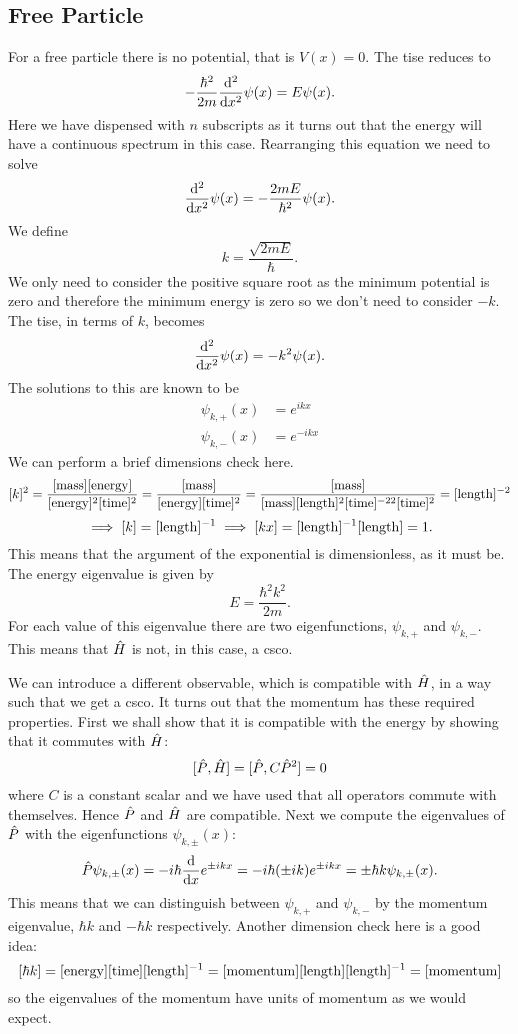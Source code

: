     \subsection{Free Particle}
    For a free particle there is no potential, that is \(V(x) = 0\).
    The \gls{tise} reduces to
    \[-\frac{\hbar^2}{2m}\dv[2]{x}\psi(x) = E\psi(x).\]
    Here we have dispensed with \(n\) subscripts as it turns out that the energy will have a continuous spectrum in this case.
    Rearranging this equation we need to solve
    \[\dv[2]{x}\psi(x) = -\frac{2mE}{\hbar^2}\psi(x).\]
    We define
    \[k = \frac{\sqrt{2mE}}{\hbar}.\]
    We only need to consider the positive square root as the minimum potential is zero and therefore the minimum energy is zero so we don't need to consider \(-k\).
    The \gls{tise}, in terms of \(k\), becomes
    \[\dv[2]{x}\psi(x) = -k^2\psi(x).\]
    The solutions to this are known to be
    \begin{align*}
        \psi_{k,+}(x) &= e^{ikx}\\
        \psi_{k,-}(x) &= e^{-ikx}
    \end{align*}
    We can perform a brief dimensions check here.
    \[[k]^2 = \frac{[\mathrm{mass}][\mathrm{energy}]}{[\mathrm{energy}]^2[\mathrm{time}]^2} = \frac{[\mathrm{mass}]}{[\mathrm{energy}][\mathrm{time}]^2} = \frac{[\mathrm{mass}]}{[\mathrm{mass}][\mathrm{length}]^2[\mathrm{time}]^{-22}[\mathrm{time}]^2} = [\mathrm{length}]^{-2}\]
    \[\implies [k] = [\mathrm{length}]^{-1} \implies [kx] = [\mathrm{length}]^{-1}[\mathrm{length}] = 1.\]
    This means that the argument of the exponential is dimensionless, as it must be.
    The energy eigenvalue is given by
    \[E = \frac{\hbar^2k^2}{2m}.\]
    For each value of this eigenvalue there are two eigenfunctions, \(\psi_{k,+}\) and \(\psi_{k,-}\).
    This means that \(\hat{H}\) is not, in this case, a \gls{csco}.
    
    We can introduce a different observable, which is compatible with \(\hat{H}\), in a way such that we get a \gls{csco}.
    It turns out that the momentum has these required properties.
    First we shall show that it is compatible with the energy by showing that it commutes with \(\hat{H}\):
    \[[\hat{P}, \hat{H}] = [\hat{P}, C\hat{P}^2] = 0\]
    where \(C\) is a constant scalar and we have used that all operators commute with themselves.
    Hence \(\hat{P}\) and \(\hat{H}\) are compatible.
    Next we compute the eigenvalues of \(\hat{P}\) with the eigenfunctions \(\psi_{k,\pm}(x)\):
    \[\hat{P}\psi_{k,\pm}(x) = -i\hbar\dv{x}e^{\pm ikx} = -i\hbar(\pm ik)e^{\pm ikx} = \pm \hbar k\psi_{k,\pm}(x).\]
    This means that we can distinguish between \(\psi_{k,+}\) and \(\psi_{k,-}\) by the momentum eigenvalue, \(\hbar k\) and \(-\hbar k\) respectively.
    Another dimension check here is a good idea:
    \[[\hbar k] = [\mathrm{energy}][\mathrm{time}][\mathrm{length}]^{-1} = [\mathrm{momentum}][\mathrm{length}][\mathrm{length}]^{-1} = [\mathrm{momentum}]\]
    so the eigenvalues of the momentum have units of momentum as we would expect.
    
